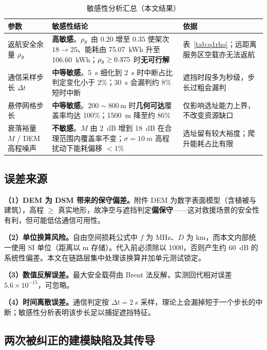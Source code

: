 \begin{table}[htbp]
	\caption{敏感性分析汇总（本文结果）}
	\label{tab:sens}
	\centering
	\begin{tabular}{p{3.1cm}p{6.0cm}p{5.2cm}}
		\toprule
		参数 & 敏感性结论 & 依据 \\
		\midrule
		返航安全余量 $\rho_{g}$
		& \textbf{高敏感}。$\rho_{g}$ 由 $0.20$ 增至 $0.35$ 使架次 $18\to25$、能耗由 \SI{75.07}{kWh} 升至 \SI{106.60}{kWh}；$\rho_{g}\ge0.375$ 时\textbf{无可行解}
		& 表~\ref{tab:q1rho}；远距离服务区空载亦无法返航 \\
		通信采样步长 $\Delta t$
		& \textbf{中等敏感}。\SI{5}{s} 细化到 \SI{2}{s} 时中断占比判定变化小于 2\%；\SI{30}{s} 会漏判约 8\% 短时中断
		& 遮挡时段多为秒级，步长过粗会漏判 \\
		悬停网格步长
		& \textbf{中等敏感}。$200\sim800$\,m 时\textbf{几何可达}覆盖率均达 100\%；\SI{1500}{m} 降至约 86\%
		& 仅影响选址能力上界，不改变资源缺口 \\
		衰落裕量 $M$ / DEM 高程噪声
		& \textbf{不敏感}。$M$ 由 \SI{2}{dB} 增到 \SI{18}{dB} 在合理范围内覆盖率不变；$\sigma=\SI{10}{m}$ 高程扰动下能耗偏移 $<1\%$
		& 选址留有较大裕度；爬升能耗占比有限 \\
		\bottomrule
	\end{tabular}
\end{table}

\subsection{误差来源}

\textbf{（1）DEM 为 DSM 带来的保守偏差。}附件 DEM 为数字表面模型（含植被与建筑），高程 $\ge$ 真实地形，故净空与遮挡判定\textbf{偏保守}——这对救援场景的安全性有利，但可能低估通信可用性。

\textbf{（2）单位换算风险。}自由空间损耗公式中 $f$ 为 MHz、$D$ 为 km，而本文内部统一使用 SI 单位（距离以 m 存储）。代入前必须除以 1000，否则产生约 \SI{60}{dB} 的系统性偏差。本文在链路层集中处理该换算并加单元测试锁定。

\textbf{（3）数值反解误差。}最大安全载荷由 Brent 法反解，实测回代相对误差 $5.6\times10^{-15}$，可忽略。

\textbf{（4）时间离散误差。}通信判定按 $\Delta t=\SI{2}{s}$ 采样，理论上会漏掉短于一个步长的中断；敏感性分析表明该步长足以捕捉遮挡特征。

\subsection{两次被纠正的建模缺陷及其传导}\label{sec:changes}

